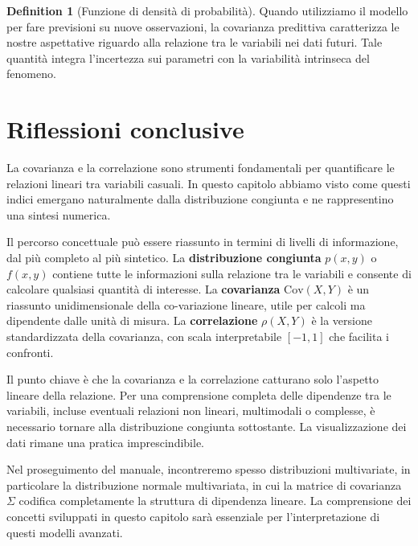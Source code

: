 \documentclass[
  letterpaper,
  DIV=11,
  numbers=noendperiod,
  oneside]{scrreprt}
\theoremstyle{definition}
\theoremstyle{plain}
\theoremstyle{definition}
\newtheorem{definition}{Definition}[chapter]
\theoremstyle{remark}
\begin{document}
\begin{definition}[Funzione di densità di
probabilità]
Quando utilizziamo il modello per fare previsioni su nuove osservazioni,
la covarianza predittiva caratterizza le nostre aspettative riguardo
alla relazione tra le variabili nei dati futuri. Tale quantità integra
l'incertezza sui parametri con la variabilità intrinseca del fenomeno.

\section*{Riflessioni conclusive}\label{riflessioni-conclusive-8}


La covarianza e la correlazione sono strumenti fondamentali per
quantificare le relazioni lineari tra variabili casuali. In questo
capitolo abbiamo visto come questi indici emergano naturalmente dalla
distribuzione congiunta e ne rappresentino una sintesi numerica.

Il percorso concettuale può essere riassunto in termini di livelli di
informazione, dal più completo al più sintetico. La
\textbf{distribuzione congiunta} \(p(x,y)\) o \(f(x,y)\) contiene tutte
le informazioni sulla relazione tra le variabili e consente di calcolare
qualsiasi quantità di interesse. La \textbf{covarianza}
\(\text{Cov}(X,Y)\) è un riassunto unidimensionale della co-variazione
lineare, utile per calcoli ma dipendente dalle unità di misura. La
\textbf{correlazione} \(\rho(X,Y)\) è la versione standardizzata della
covarianza, con scala interpretabile \([-1, 1]\) che facilita i
confronti.

Il punto chiave è che la covarianza e la correlazione catturano solo
l'aspetto lineare della relazione. Per una comprensione completa delle
dipendenze tra le variabili, incluse eventuali relazioni non lineari,
multimodali o complesse, è necessario tornare alla distribuzione
congiunta sottostante. La visualizzazione dei dati rimane una pratica
imprescindibile.

Nel proseguimento del manuale, incontreremo spesso distribuzioni
multivariate, in particolare la distribuzione normale multivariata, in
cui la matrice di covarianza \(\Sigma\) codifica completamente la
struttura di dipendenza lineare. La comprensione dei concetti sviluppati
in questo capitolo sarà essenziale per l'interpretazione di questi
modelli avanzati.

\begin{tcolorbox}[enhanced jigsaw, arc=.35mm, breakable, colbacktitle=quarto-callout-note-color!10!white, opacityback=0, toprule=.15mm, rightrule=.15mm, colback=white, opacitybacktitle=0.6, leftrule=.75mm, coltitle=black, bottomtitle=1mm, left=2mm, toptitle=1mm, title=\textcolor{quarto-callout-note-color}{\faInfo}\hspace{0.5em}{Informazioni sull'ambiente di sviluppo}, titlerule=0mm, bottomrule=.15mm, colframe=quarto-callout-note-color-frame]


\end{tcolorbox}
\end{definition}
\end{document}
